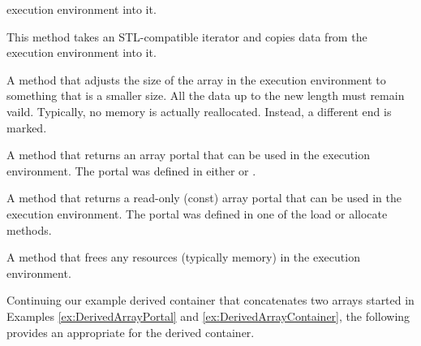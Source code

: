 \begin{description}
  execution environment into it.
\item[\textcode{CopyInto}] This method takes an STL-compatible iterator and
  copies data from the execution environment into it.
\item[\textcode{Shrink}] A method that adjusts the size of the array in the
  execution environment to something that is a smaller size. All the data
  up to the new length must remain vaild. Typically, no memory is actually
  reallocated. Instead, a different end is marked.
\item[\textcode{GetPortalExecution}] A method that returns an array portal
  that can be used in the execution environment. The portal was defined in
  either  or
  .
\item[\textcode{GetPortalConstExecution}] A method that returns a read-only
  (const) array portal that can be used in the execution environment. The
  portal was defined in one of the load or allocate methods.
\item[\textcode{ReleaseResources}] A method that frees any resources
  (typically memory) in the execution environment.
\end{description}

Continuing our example derived container that concatenates two arrays
started in Examples \ref{ex:DerivedArrayPortal} and
\ref{ex:DerivedArrayContainer}, the following provides an
 appropriate for the derived container.

